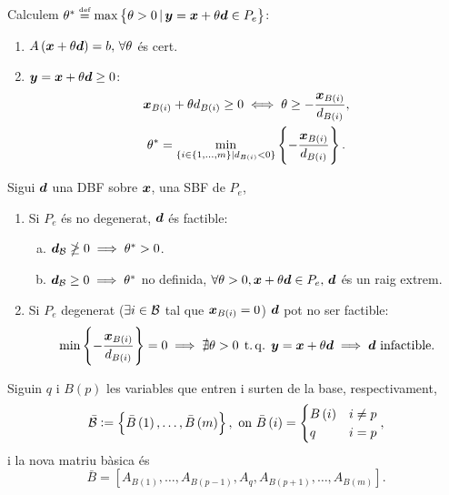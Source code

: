 \begin{prop}
    Calculem $\theta^* \stackrel{\text{\tiny def}}{=} \max \left\{ \theta > 0 \, |\, \boldsymbol{y} = \boldsymbol{x} + \theta \boldsymbol{d} \in P_e\right\}$:
    \begin{enumerate}
        \item $A\left(\boldsymbol{x} + \theta \boldsymbol{d}\right) = b,\, \forall \theta$ és cert.
        \item $\boldsymbol{y} = \boldsymbol{x} + \theta \boldsymbol{d} \geq 0$:
            \begin{gather*}
                \boldsymbol{x}_{B\left(i\right)} + \theta d_{B\left(i\right)} \geq 0 \iff \theta \geq -\frac{\boldsymbol{x}_{B\left(i\right)}}{d_{B\left(i\right)}}, \\
                \theta^* = \min_{\{i \in \left\{1, \dots, m \right\} \mid d_{B\left(i\right)} < 0\}} \left\{ - \frac{\boldsymbol{x}_{B\left(i\right)}}{d_{B\left(i\right)}} \right\}.
            \end{gather*}
    \end{enumerate}
\end{prop}
\begin{prop}
    Sigui $\boldsymbol{d}$ una DBF sobre $\boldsymbol{x}$, una SBF de $P_e$,
    \begin{enumerate}
        \item Si $P_e$ és no degenerat, $\boldsymbol{d}$ és factible:
            \begin{enumerate}[a)]
                \item $\boldsymbol{d}_{\mathcal{B}} \ngeq 0 \implies \theta^* > 0$.
                \item $\boldsymbol{d}_{\mathcal{B}} \geq 0 \implies \theta^*$ no definida, $\forall \theta > 0, \boldsymbol{x} + \theta \boldsymbol{d} \in P_e,\, \boldsymbol{d}$ és un raig extrem.
            \end{enumerate}
        \item Si $P_e$ degenerat ($\exists i \in \mathcal{B}$ tal que $\boldsymbol{x}_{B\left(i\right)} = 0$) $\boldsymbol{d}$ pot no ser factible:
            \begin{gather*}
                \min \left\{ -\frac{\boldsymbol{x}_{B\left(i\right)}}{d_{B\left(i\right)}} \right\} = 0 \implies \nexists \theta > 0 \operatorname{\;t.q.\;} \boldsymbol{y} = \boldsymbol{x}+\theta \boldsymbol{d} \implies \boldsymbol{d} \text{ infactible}.
            \end{gather*}
    \end{enumerate}
\end{prop}
\begin{prop}
    Siguin $q$ i $B\left(p\right)$ les variables que entren i surten de la base, respectivament,
    \begin{gather*}
        \bar{\mathcal{B}} := \left\{ \bar{B}\left(1\right), \dots, \bar{B}\left(m\right) \right\}, \text{ on } \bar{B}\left(i\right) =
        \begin{cases}
            B\left(i\right) & i \neq p \\
            q & i = p
        \end{cases},
    \end{gather*}
    i la nova matriu bàsica és
    \[ \bar{B} = \left[A_{B\left(1\right)}, \dots, A_{B\left(p-1\right)}, A_q, A_{B\left(p+1\right)}, \dots, A_{B\left(m\right)} \right]. \]
\end{prop}
